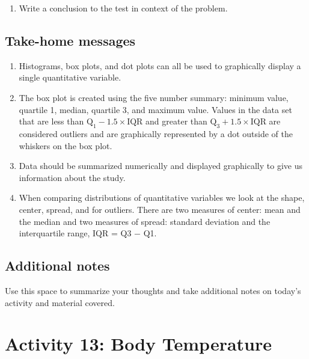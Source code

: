 \documentclass[
]{report}
\providecommand{\tightlist}{%
  \setlength{\itemsep}{0pt}\setlength{\parskip}{0pt}}
\begin{document}
\vspace{1in}

\begin{enumerate}
\def\labelenumi{\arabic{enumi}.}
\setcounter{enumi}{10}
\tightlist
\item
  Write a conclusion to the test in context of the problem.
\end{enumerate}

\vspace{1in}

\subsection{Take-home messages}\label{take-home-messages-11}

\begin{enumerate}
\def\labelenumi{\arabic{enumi}.}
\item
  Histograms, box plots, and dot plots can all be used to graphically display a single quantitative variable.
\item
  The box plot is created using the five number summary: minimum value, quartile 1, median, quartile 3, and maximum value. Values in the data set that are less than \(\text{Q}_1 - 1.5\times \text{IQR}\) and greater than \(\text{Q}_3 + 1.5\times \text{IQR}\) are considered outliers and are graphically represented by a dot outside of the whiskers on the box plot.
\item
  Data should be summarized numerically and displayed graphically to give us information about the study.
\item
  When comparing distributions of quantitative variables we look at the shape, center, spread, and for outliers. There are two measures of center: mean and the median and two measures of spread: standard deviation and the interquartile range, IQR = Q3 \(-\) Q1.
\end{enumerate}

\subsection{Additional notes}\label{additional-notes-11}

Use this space to summarize your thoughts and take additional notes on today's activity and material covered.

\newpage

\section{Activity 13: Body Temperature}\label{activity-13-body-temperature}
\end{document}

